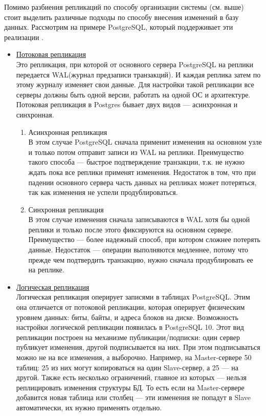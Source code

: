 \begin{enumerate}
    Помимо разбиения репликаций по способу организации системы (см. выше) стоит выделить различные подходы по способу внесения изменений в базу данных. Рассмотрим на примере PostgreSQL, который поддерживает эти реализации \autocite{PostrgreSQL1}.
    \begin{itemize}
        \item \underline{Потоковая репликация} \\Это репликация, при которой от основного сервера PostgreSQL на реплики передается WAL(журнал предзаписи транзакций). И каждая реплика затем по этому журналу изменяет свои данные. Для настройки такой репликации все серверы должны быть одной версии, работать на одной ОС и архитектуре. Потоковая репликация в Postgres бывает двух видов — асинхронная и синхронная.
		\begin{enumerate}
        		\item{Асинхронная репликация} \\В этом случае PostgreSQL сначала применит изменения на основном узле и только потом отправит записи из WAL на реплики. Преимущество такого способа — быстрое подтверждение транзакции, т.к. не нужно ждать пока все реплики применят изменения. Недостаток в том, что при падении основного сервера часть данных на репликах может потеряться, так как изменения не успели продублироваться.
        		\item{Синхронная репликация} \\В этом случае изменения сначала записываются в WAL хотя бы одной реплики и только после этого фиксируются на основном сервере. Преимущество — более надежный способ, при котором сложнее потерять данные. Недостаток — операции выполняются медленнее, потому что прежде чем подтвердить транзакцию, нужно сначала продублировать ее на реплике.
        	\end{enumerate}
        	\item \underline{Логическая репликация} \\Логическая репликация оперирует записями в таблицах PostgreSQL. Этим она отличается от потоковой репликации, которая оперирует физическим уровнем данных: биты, байты, и адреса блоков на диске. Возможность настройки логической репликации появилась в PostgreSQL 10.
Этот вид репликации построен на механизме публикации/подписки: один сервер публикует изменения, другой подписывается на них. При этом подписываться можно не на все изменения, а выборочно. Например, на Master-сервере 50 таблиц: 25 из них могут копироваться на один Slave-сервер, а 25 — на другой.
Также есть несколько ограничений, главное из которых — нельзя реплицировать изменения структуры БД. То есть если на Master-сервере добавится новая таблица или столбец — эти изменения не попадут в Slave автоматически, их нужно применять отдельно.

\end{itemize}
\end{enumerate}
